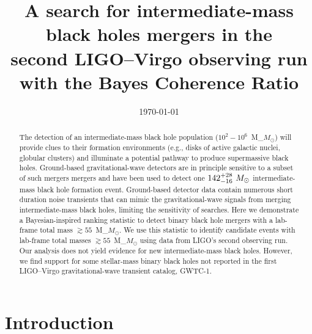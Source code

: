 \documentclass[
 nofootinbib,
 amsmath,amssymb,
 aps,
 twocolumn,
 superscriptaddress
]{revtex4-2}
\newcommand{\mathcmd}[1]{{\sc \relax\ifmmode#1\else $#1$\fi}\xspace}
\newcommand{\msun}{\mathcmd{M_\odot}}
\begin{document}
\title{A search for intermediate-mass black holes mergers in the \\second LIGO--Virgo observing run with the Bayes Coherence Ratio}




\date{\today}


\begin{abstract}
The detection of an intermediate-mass black hole population ($10^2-10^6$~\msun) will provide clues to their formation environments (e.g., disks of active galactic nuclei, globular clusters) and illuminate a potential pathway to produce supermassive black holes. Ground-based gravitational-wave detectors are in principle sensitive to a subset of such mergers mergers and have been used to detect one $142^{+28}_{-16}~\msun$ intermediate-mass black hole formation event. Ground-based detector data contain numerous short duration noise transients that can mimic the gravitational-wave signals from merging intermediate-mass black holes, limiting the sensitivity of searches. Here we demonstrate a Bayesian-inspired ranking statistic to detect binary black hole mergers with a lab-frame total mass $\gtrsim55$~\msun. We use this statistic to identify candidate events with lab-frame total masses $\gtrsim55$~\msun using data from LIGO's second observing run. Our analysis does not yield evidence for new intermediate-mass black holes. However, we find support for some stellar-mass binary black holes not reported in the first LIGO--Virgo gravitational-wave transient catalog, GWTC-1.
\end{abstract}



\maketitle

\section{Introduction}
\end{document}
